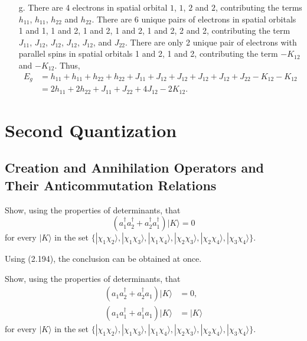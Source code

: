 \documentclass[a4paper]{book}
\newcounter{exercise}[chapter]
\newcounter{solution}[chapter]
\begin{document}
\begin{solution}
\begin{itemize}
	\item[g.] There are 4 electrons in spatial orbital $1$, $1$, $2$ and $2$, contributing the terms $h_{11}$, $h_{11}$, $h_{22}$  and $h_{22}$. There are 6 unique pairs of electrons in spatial orbitals 1 and 1, 1 and 2, 1 and 2, 1 and 2, 1 and 2, 2 and 2, contributing the term $J_{11}$, $J_{12}$, $J_{12}$, $J_{12}$, $J_{12}$, and $J_{22}$. There are only 2 unique pair of electrons with parallel spins in spatial orbitals 1 and 2, 1 and 2, contributing the term $-K_{12}$ and $-K_{12}$. Thus,
	\begin{align*}
		E_g &= h_{11} + h_{11} + h_{22} + h_{22} + J_{11} + J_{12} + J_{12} + J_{12} + J_{12} + J_{22} - K_{12} - K_{12} \\
		&= 2h_{11} + 2h_{22} +  J_{11} +  J_{22} + 4J_{12} - 2K_{12} .
	\end{align*}
	
	\end{itemize}		
	
	\end{solution}
	
	\section{Second Quantization}
	
	\subsection{Creation and Annihilation Operators and Their Anticommutation Relations}
	
	\begin{exercise}
	Show, using the properties of determinants, that
	\[
		( a^\dagger_1 a^\dagger_2 + a^\dagger_2 a^\dagger_1 ) | K \rangle = 0 
	\]
	for every $| K \rangle$ in the set $\{ |\chi_1\chi_2\rangle , |\chi_1\chi_3\rangle , |\chi_1\chi_4\rangle , |\chi_2\chi_3\rangle , |\chi_2\chi_4\rangle , |\chi_3\chi_4\rangle \}$.
	\end{exercise}
	
	\begin{solution}
	
	Using (2.194), the conclusion can be obtained at once.	
	
	\end{solution}
	
	\begin{exercise}
	Show, using the properties of determinants, that
	\begin{align*}
		( a_1 a^\dagger_2 + a^\dagger_2 a_1 ) | K \rangle &= 0 , \\
		( a_1 a^\dagger_1 + a^\dagger_1 a_1 ) | K \rangle &= | K \rangle
	\end{align*}
	for every $| K \rangle$ in the set $\{ |\chi_1\chi_2\rangle , |\chi_1\chi_3\rangle , |\chi_1\chi_4\rangle , |\chi_2\chi_3\rangle , |\chi_2\chi_4\rangle , |\chi_3\chi_4\rangle \}$.
	\end{exercise}
	
\end{document}
